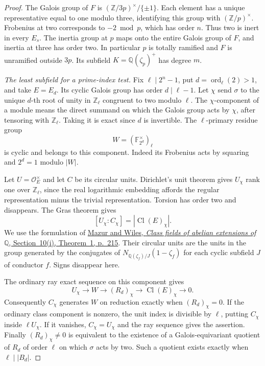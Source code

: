 \documentclass[11pt]{article}
\newcommand{\ord}{\operatorname{ord}}
\begin{document}
\begin{proof}
The Galois group of \(F\) is
\((\mathbb Z/3p)^\times/\{\pm1\}\). Each element has a unique
representative equal to one modulo three, identifying this group
with \((\mathbb Z/p)^\times\). Frobenius at two corresponds to
\(-2\bmod p\), which has order \(n\). Thus two is inert in every
\(E_s\). The inertia group at \(p\) maps onto the entire Galois
group of \(F\), and inertia at three has order two. In particular
\(p\) is totally ramified and \(F\) is unramified outside \(3p\).
Its subfield \(K=\mathbb Q(\zeta_p)^+\) has degree \(m\).

\emph{The least subfield for a prime-index test.}
Fix \(\ell\mid2^n-1\), put \(d=\ord_\ell(2)>1\), and take
\(E=E_d\). Its cyclic Galois group has order \(d\mid\ell-1\).
Let \(\chi\) send \(\sigma\) to the unique \(d\)-th root of unity
in \(\mathbb Z_\ell\) congruent to two modulo \(\ell\).
The \(\chi\)-component of a module means the direct summand on which
the Galois group acts by \(\chi\), after tensoring with
\(\mathbb Z_\ell\). Taking it is exact since \(d\) is invertible.
The \(\ell\)-primary residue group
\[
                     W=(\mathbb F_{2^d}^{\times})_\ell
\]
is cyclic and belongs to this component. Indeed its Frobenius acts
by squaring and \(2^d=1\) modulo \(|W|\).

Let \(U=\mathcal O_E^\times\) and let \(C\) be its circular units.
Dirichlet's unit theorem gives \(U_\chi\) rank one over
\(\mathbb Z_\ell\), since the real logarithmic embedding affords
the regular representation minus the trivial representation. Torsion has order
two and disappears. The Gras theorem gives
\[
              [U_\chi:C_\chi]=|\operatorname{Cl}(E)_\chi|.
\]
We use the formulation of
\href{https://gdz.sub.uni-goettingen.de/download/pdf/PPN356556735_0076/LOG_0020.pdf#page=37}
{Mazur and Wiles, \emph{Class fields of abelian extensions of
\(\mathbb Q\)}, Section~10(i), Theorem~1, p.~215}.
Their circular units are the units in the group generated by the
conjugates of \(N_{\mathbb Q(\zeta_f)/J}(1-\zeta_f)\) for each
cyclic subfield \(J\) of conductor \(f\). Signs disappear here.

The ordinary ray exact sequence on this component gives
\[
            U_\chi\longrightarrow W\longrightarrow
            (R_d)_\chi\longrightarrow\operatorname{Cl}(E)_\chi
            \longrightarrow0 .
\]
Consequently \(C_\chi\) generates \(W\) on reduction exactly when
\((R_d)_\chi=0\). If the ordinary class component is nonzero, the
unit index is divisible by \(\ell\), putting \(C_\chi\) inside
\(\ell U_\chi\). If it vanishes, \(C_\chi=U_\chi\) and the ray
sequence gives the assertion. Finally \((R_d)_\chi\ne0\) is
equivalent to the existence of a Galois-equivariant quotient of
\(R_d\) of order \(\ell\) on which \(\sigma\) acts by two.
Such a quotient exists exactly when \(\ell\mid |B_d|\).


\end{proof}
\end{document}
